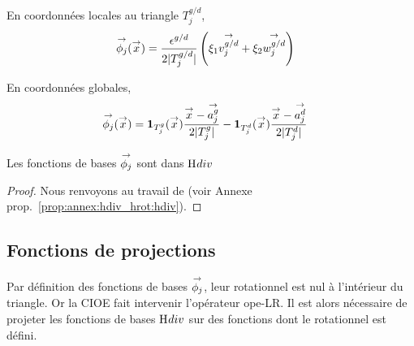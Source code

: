       \begin{minipage}{0.45\textwidth}
          \begin{center}
            \begin{tikzpicture}[scale=1]
              
            \end{tikzpicture}
          \end{center}
          \label{fig:form_int:fon_base:phi}
      \end{minipage}
      \begin{minipage}{0.54\textwidth}
        En coordonnées locales au triangle \(T_j^{g/d}\),
        \begin{align*}
         \phij(\vx) &= \frac{\epsilon^{g/d}}{2|T_j^{g/d}|}\left(\xi_1 \vect{v_j^{g/d}} + \xi_2 \vect{w_j^{g/d}}\right)
        \end{align*}

        En coordonnées globales,
        \begin{align*}
          \phij(\vx) &= \mathbf{1}_{T_j^g}(\vx)\frac{\vx-\vect{a_j^g}}{2|T_j^g|} - \mathbf{1}_{T_j^d}(\vx)\frac{\vx-\vect{a_j^d}}{2|T_j^d|}
        \end{align*}
      \end{minipage}

      \begin{prop}
        Les fonctions de bases \(\phij\) sont dans \(\Hdiv\)
      \end{prop}
      \begin{proof}
        Nous renvoyons au travail de \cite{nedelec_mixed_1980} (voir Annexe prop.~\ref{prop:annex:hdiv_hrot:hdiv}).
      \end{proof}


  \subsection{Fonctions de projections}
    Par définition des fonctions de bases \(\phij\), leur rotationnel est nul à l'intérieur du triangle. Or la CIOE fait intervenir l'opérateur \gls{ope-LR}. Il est alors nécessaire de projeter les fonctions de bases \(\Hdiv\) sur des fonctions dont le rotationnel est défini.

